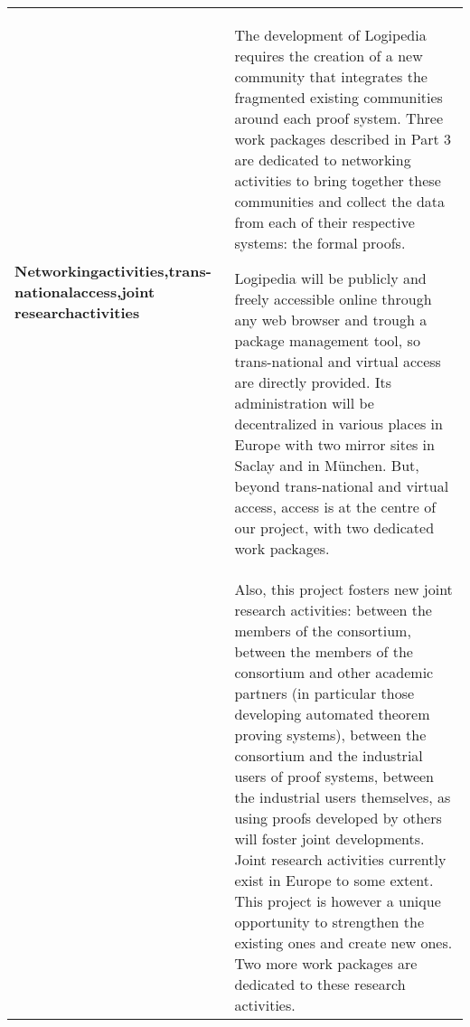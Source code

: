 \begin{longtable}{|p{}|p{}|}
{\bf Networking\newline activities,\newline trans-national\newline access,\newline joint research\newline activities}
&
The development of Logipedia requires the creation of a new community that
integrates the fragmented existing communities around each proof system.
Three work packages described in Part 3
are dedicated to networking activities
to bring together these communities and collect the data from each of
their respective systems: the formal proofs.

\hspace{0.4cm}
Logipedia will be publicly and freely accessible online through any
web browser and trough a package management tool, so trans-national
and virtual access are directly provided. Its administration will be
decentralized in various places in Europe with two mirror sites in
Saclay and in M\"unchen. But, beyond trans-national and virtual
access, access is at the centre of our project, with two dedicated
work packages.\\
&
\hspace{0.4cm}
Also, this project fosters new joint research activities:
between the members of the consortium, between the members of
the consortium and other academic partners (in particular those
developing automated theorem proving systems), between the
consortium and the industrial users of proof systems, between
the industrial users themselves, as using proofs developed by others
will foster joint developments.  Joint research activities
currently exist in Europe to some extent.  This project is however a
unique opportunity to strengthen the existing ones and create new
ones. Two more work packages are dedicated
to these research activities.  
\\
\hline


\end{longtable}
